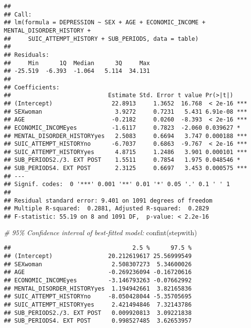 \documentclass[
]{book}
\newenvironment{Shaded}{\begin{snugshade}}{\end{snugshade}}
\newcommand{\CommentTok}[1]{\textcolor[rgb]{0.56,0.35,0.01}{\textit{#1}}}
\newcommand{\FunctionTok}[1]{\textcolor[rgb]{0.00,0.00,0.00}{#1}}
\newcommand{\NormalTok}[1]{#1}
\newcommand{\SpecialCharTok}[1]{\textcolor[rgb]{0.00,0.00,0.00}{#1}}
\begin{document}
\begin{verbatim}
## 
## Call:
## lm(formula = DEPRESSION ~ SEX + AGE + ECONOMIC_INCOME + MENTAL_DISORDER_HISTORY + 
##     SUIC_ATTEMPT_HISTORY + SUB_PERIODS, data = table)
## 
## Residuals:
##     Min      1Q  Median      3Q     Max 
## -25.519  -6.393  -1.064   5.114  34.131 
## 
## Coefficients:
##                            Estimate Std. Error t value Pr(>|t|)    
## (Intercept)                 22.8913     1.3652  16.768  < 2e-16 ***
## SEXwoman                     3.9272     0.7231   5.431 6.91e-08 ***
## AGE                         -0.2182     0.0260  -8.393  < 2e-16 ***
## ECONOMIC_INCOMEyes          -1.6117     0.7823  -2.060 0.039627 *  
## MENTAL_DISORDER_HISTORYyes   2.5083     0.6694   3.747 0.000188 ***
## SUIC_ATTEMPT_HISTORYno      -6.7037     0.6863  -9.767  < 2e-16 ***
## SUIC_ATTEMPT_HISTORYyes      4.8715     1.2486   3.901 0.000101 ***
## SUB_PERIODS2./3. EXT POST    1.5511     0.7854   1.975 0.048546 *  
## SUB_PERIODS4. EXT POST       2.3125     0.6697   3.453 0.000575 ***
## ---
## Signif. codes:  0 '***' 0.001 '**' 0.01 '*' 0.05 '.' 0.1 ' ' 1
## 
## Residual standard error: 9.401 on 1091 degrees of freedom
## Multiple R-squared:  0.2881, Adjusted R-squared:  0.2829 
## F-statistic: 55.19 on 8 and 1091 DF,  p-value: < 2.2e-16
\end{verbatim}

\begin{Shaded}
\begin{Highlighting}[]
\CommentTok{\# 95\% Confidence interval of best{-}fitted model:}
\FunctionTok{confint}\NormalTok{(stepwith)}
\end{Highlighting}
\end{Shaded}

\begin{verbatim}
##                                   2.5 %      97.5 %
## (Intercept)                20.212619617 25.56999549
## SEXwoman                    2.508307273  5.34600026
## AGE                        -0.269236094 -0.16720616
## ECONOMIC_INCOMEyes         -3.146793263 -0.07662992
## MENTAL_DISORDER_HISTORYyes  1.194942661  3.82165836
## SUIC_ATTEMPT_HISTORYno     -8.050428044 -5.35705695
## SUIC_ATTEMPT_HISTORYyes     2.421494846  7.32143786
## SUB_PERIODS2./3. EXT POST   0.009920813  3.09221838
## SUB_PERIODS4. EXT POST      0.998527485  3.62653957
\end{verbatim}

\begin{Shaded}
\end{Shaded}
\end{document}
